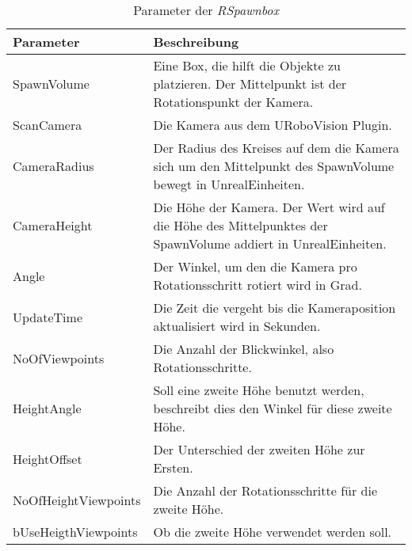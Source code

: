 \begin{table}
\begin{tabularx}{\textwidth}{lX}
\textbf{Parameter}  & \textbf{Beschreibung} \\ \hline
SpawnVolume         & Eine Box, die hilft die Objekte zu platzieren. Der Mittelpunkt ist der Rotationspunkt der Kamera.\\  \hline
ScanCamera          & Die Kamera aus dem URoboVision Plugin. \\ \hline
CameraRadius        & Der Radius des Kreises auf dem die Kamera sich um den Mittelpunkt des SpawnVolume bewegt in UnrealEinheiten.\\ \hline
CameraHeight        & Die Höhe der Kamera. Der Wert wird auf die Höhe des Mittelpunktes der SpawnVolume addiert in UnrealEinheiten.\\ \hline
Angle               & Der Winkel, um den die Kamera pro Rotationsschritt rotiert wird in Grad.\\ \hline
UpdateTime          & Die Zeit die vergeht bis die Kameraposition aktualisiert wird in Sekunden.\\ \hline
NoOfViewpoints      & Die Anzahl der Blickwinkel, also Rotationsschritte.\\ \hline
HeightAngle         & Soll eine zweite Höhe benutzt werden, beschreibt dies den Winkel für diese zweite Höhe.\\ \hline
HeightOffset        & Der Unterschied der zweiten Höhe zur Ersten.\\ \hline 
NoOfHeightViewpoints & Die Anzahl der Rotationsschritte für die zweite Höhe.\\  \hline
bUseHeigthViewpoints & Ob die zweite Höhe verwendet werden soll. \\  \hline
\end{tabularx}
\caption{Parameter der \textit{RSpawnbox}}
\label{tab:spawnboxParams}
\end{table}
%

